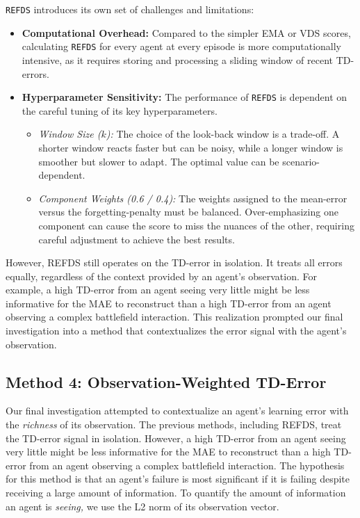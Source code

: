 \texttt{REFDS} introduces its own set of challenges and limitations:
\begin{itemize}
    \item \textbf{Computational Overhead:} Compared to the simpler EMA or VDS scores, calculating \texttt{REFDS} for every agent at every episode is more computationally intensive, as it requires storing and processing a sliding window of recent TD-errors.
    
    \item \textbf{Hyperparameter Sensitivity:} The performance of \texttt{REFDS} is dependent on the careful tuning of its key hyperparameters.
    \begin{itemize}
        \item \textit{Window Size ($k$):} The choice of the look-back window is a trade-off. A shorter window reacts faster but can be noisy, while a longer window is smoother but slower to adapt. The optimal value can be scenario-dependent.
        
        \item \textit{Component Weights (0.6 / 0.4):} The weights assigned to the mean-error versus the forgetting-penalty must be balanced. Over-emphasizing one component can cause the score to miss the nuances of the other, requiring careful adjustment to achieve the best results.
    \end{itemize}
\end{itemize}
However, REFDS still operates on the TD-error in isolation. It treats all errors equally, regardless of the context provided by an agent's observation. For example, a high TD-error from an agent seeing very little might be less informative for the MAE to reconstruct than a high TD-error from an agent observing a complex battlefield interaction. This realization prompted our final investigation into a method that contextualizes the error signal with the agent's observation.
\subsection{Method 4: Observation-Weighted TD-Error}

Our final investigation attempted to contextualize an agent's learning error with the \textit{richness} of its observation. The previous methods, including REFDS, treat the TD-error signal in isolation. However, a high TD-error from an agent seeing very little might be less informative for the MAE to reconstruct than a high TD-error from an agent observing a complex battlefield interaction.
The hypothesis for this method is that an agent's failure is most significant if it is failing despite receiving a large amount of information. To quantify the amount of information an agent is \textit{seeing,} we use the L2 norm of its observation vector.

